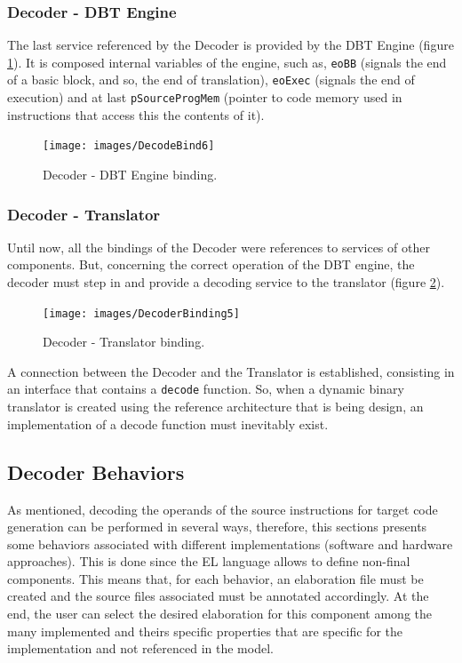     
\subsubsection*{Decoder - DBT Engine}   
    The last service referenced by the Decoder is provided by the DBT Engine (figure \ref{fig:DecoderBind6}). It is composed internal variables of the engine, such as, \texttt{eoBB} (signals the end of a basic block, and so, the end of translation), \texttt{eoExec} (signals the end of execution) and at last \texttt{pSourceProgMem} (pointer to code memory used in instructions that access this the contents of it).
    
	\begin{figure}[!htb]
    \centerline{
    \texttt{[image: images/DecodeBind6]}
    }
    \caption{Decoder - DBT Engine binding.}
    \label{fig:DecoderBind6} 
    \end{figure}
    

\subsubsection*{Decoder - Translator}

	Until now, all the bindings of the Decoder were references to services of other components. But, concerning the correct operation of the DBT engine, the decoder must step in and provide a decoding service to the translator (figure \ref{fig:DecoderBind5}).
    
	\begin{figure}[!htb]
    \centerline{
    \texttt{[image: images/DecoderBinding5]}
    }
    \caption{Decoder - Translator binding.}
    \label{fig:DecoderBind5} 
    \end{figure}
    
    A connection between the Decoder and the Translator is established, consisting in an interface that contains a \texttt{decode} function. So, when a dynamic binary translator is created using the reference architecture that is being design, an implementation of a decode function must inevitably exist.

\subsection{Decoder Behaviors}

As mentioned, decoding the operands of the source instructions for target code generation can be performed in several ways, therefore, this sections presents some behaviors associated with different implementations (software and hardware approaches). This is done since the EL language allows to define non-final components. This means that, for each behavior, an elaboration file must be created and the source files associated must be annotated accordingly. At the end, the user can select the desired elaboration for this component among the many implemented and theirs specific properties that are specific for the implementation and not referenced in the model.


